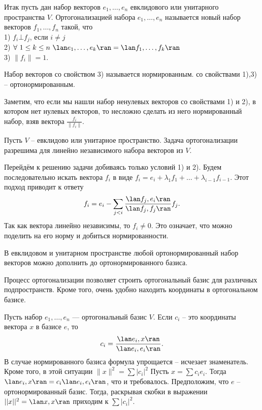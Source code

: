 Итак пусть дан набор векторов $e_1,\dots, e_n $ евклидового или унитарного пространства $V$. Ортогонализацией набора $e_1,\dots,e_n$ называется  новый набор векторов $f_1,\dots,f_n$ такой, что\\
1) $f_i \bot f_j$, если $i\neq j$\\
2) $\forall\,\, 1\leq k\leq n\,\,\lan e_1,\dots,e_k\ran=\lan f_1,\dots,f_k\ran$\\
3) $\|f_i\|=1$.

\dfn Набор векторов со свойством 3) называется нормированным. со свойствами 1),3) -- ортонормированным.
\edfn 

\rm Заметим, что если мы нашли набор ненулевых векторов со свойствами 1) и 2), в котором нет нулевых векторов, то несложно сделать из него нормированный набор, взяв вектора $\frac{f_i}{\|f_i\|}$. 
\erm

\thrm Пусть $V$ -- евклидово или унитарное пространство. Задача ортогонализации разрешима для линейно независимого набора векторов из $V$.
\proof

Перейдём к решению задачи добиваясь только условий 1) и 2). Будем последовательно искать вектора $f_i$ в виде $f_i=e_i+\lambda_1 f_1 +\dots + \lambda_{i-1} f_{i-1}$. Этот подход приводит к ответу
$$f_i=e_i-\sum_{j<i} \frac{\lan f_j,e_i\ran}{\lan f_j,f_j\ran}f_j.$$
Так как вектора линейно независимы, то $f_i\neq 0$. Это означает, что можно поделить на его норму и добиться нормированности.
\endproof
\ethrm




\crl В евклидовом и унитарном пространстве любой ортонормированный набор векторов можно дополнить до ортонормированного базиса.
\ecrl

Процесс ортогонализации позволяет строить ортогональный базис для различных подпространств. Кроме того, очень удобно находить координаты в ортогональном базисе.



 Пусть набор $e_1,\dots,e_n$ --- ортогональный базис $V$. Если $c_i$ -- это координаты вектора $x$ в базисе $e$, то 
$$c_i= \frac{\lan e_i,  x\ran}{\lan e_i, e_i\ran}.$$
В случае нормированного базиса формула упрощается -- исчезает знаменатель. Кроме того, в этой ситуации $\|x\|^2=\sum |c_i|^2$
\proof Пусть $x=\sum c_i e_i$. Тогда $\lan e_i, x\ran = c_i \lan e_i,e_i \ran$, что и требовалось.
Предположим, что $e$ -- ортонормированный базис. Тогда, раскрывая скобки в выражении $||x||^2=\lan x, x\ran$ приходим к $\sum |c_i|^2 $.
\endproof
\eutv


